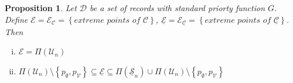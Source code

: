 \documentclass{article}
\newtheorem{prop}{Proposition}
\theoremstyle{case}
\begin{document}
\begin{prop} \label{prop0}
Let $\mathcal{D}$ be a set of records with standard priorty function $G$. Define $\mathcal{E} = \mathcal{E}_\mathcal{C} = \left\lbrace \textit{extreme points of } \mathcal{C}\right\rbrace$, $\underline{\mathcal{E}} = \mathcal{E}_{\underline{\mathcal{C}}} = \left\lbrace \textit{extreme points of } \underline{\mathcal{C}}\right\rbrace$. Then
\begin{enumerate}[(i)]
	\item $\mathcal{E} = \Pi\left( \mathcal{U}_n\right)$
	\item $\Pi\left( \mathcal{U}_n\right) \setminus{\left\lbrace p_\emptyset, p_{\mathcal{V}}\right\rbrace } \subseteq \underline{\mathcal{E}} \subseteq \Pi\left( \underline{\mathcal{S}}_n\right) \cup \Pi\left( \mathcal{U}_n\right) \setminus{\left\lbrace p_\emptyset, p_{\mathcal{V}}\right\rbrace }$
\end{enumerate}
\end{prop}
\end{document}
